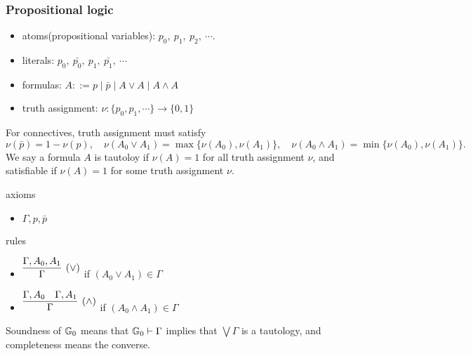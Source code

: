 \documentclass{../../small}
\begin{document}
\subsubsection*{Propositional logic}
\begin{itemize}
\item atoms(propositional variables): $p_0,\ p_1,\ p_2,\ \cdots$.
\item literals: $p_0,\ \bar{p_0},\ p_1,\ \bar{p_1},\ \cdots$
\item formulas: $A::=p\mid\bar p\mid A\vee A\mid A\wedge A$
\item truth assignment: $\nu:\{p_0,p_1,\cdots\}\to\{0,1\}$
\end{itemize}

For connectives, truth assignment must satisfy
\[\nu(\bar p)=1-\nu(p),\quad\nu(A_0\vee A_1)=\max\{\nu(A_0),\nu(A_1)\},\quad\nu(A_0\wedge A_1)=\min\{\nu(A_0),\nu(A_1)\}.\]
We say a formula $A$ is tautoloy if $\nu(A)=1$ for all truth assignment $\nu$, and satisfiable if $\nu(A)=1$ for some truth assignment $\nu$.

\begin{defn*}
axioms
\begin{itemize}
\item $\Gamma,p,\bar p$
\end{itemize}
rules
\begin{itemize}
\item $\infer[(\vee)]{\Gamma}{\Gamma,A_0,A_1}$ if $(A_0\vee A_1)\in\Gamma$
\item $\infer[(\wedge)]{\Gamma}{\Gamma,A_0 & \Gamma,A_1}$ if $(A_0\wedge A_1)\in\Gamma$
\end{itemize}
\end{defn*}

Soundness of $\mathbb{G}_0$ means that $\mathbb{G}_0\vdash\Gamma$ implies that $\bigvee\Gamma$ is a tautology, and completeness means the converse.
\end{document}

